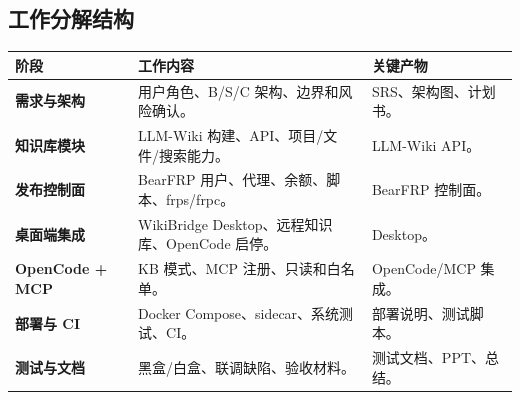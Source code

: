 \documentclass[UTF8,a4paper,12pt,fontset=fandol]{ctexart}
\begin{document}
\subsection{工作分解结构}
\begin{longtable}{>{\bfseries}p{3.0cm}p{5.8cm}p{5.4cm}}
\toprule
阶段 & 工作内容 & 关键产物 \\
\midrule
需求与架构 & 用户角色、B/S/C 架构、边界和风险确认。 & SRS、架构图、计划书。 \\
知识库模块 & LLM-Wiki 构建、API、项目/文件/搜索能力。 & LLM-Wiki API。 \\
发布控制面 & BearFRP 用户、代理、余额、脚本、frps/frpc。 & BearFRP 控制面。 \\
桌面端集成 & WikiBridge Desktop、远程知识库、OpenCode 启停。 & Desktop。 \\
OpenCode + MCP & KB 模式、MCP 注册、只读和白名单。 & OpenCode/MCP 集成。 \\
部署与 CI & Docker Compose、sidecar、系统测试、CI。 & 部署说明、测试脚本。 \\
测试与文档 & 黑盒/白盒、联调缺陷、验收材料。 & 测试文档、PPT、总结。 \\
\bottomrule
\end{longtable}
\end{document}
